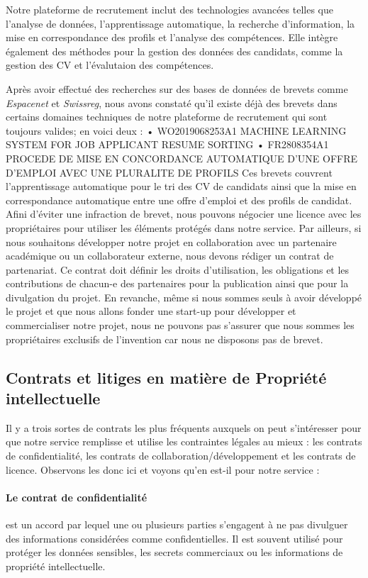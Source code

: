 Notre plateforme de recrutement inclut des technologies avancées telles que l’analyse de données, l’apprentissage automatique, la recherche d’information, la mise en correspondance des profils et l’analyse des compétences. Elle intègre également des méthodes pour la gestion des données des candidats, comme la gestion des CV et l’évalutaion des compétences.\newline 

Après avoir effectué des recherches sur des bases de données de brevets comme \textit{Espacenet} et \textit{Swissreg}, nous avons constaté qu'il existe déjà des brevets dans certains domaines techniques de notre plateforme de recrutement qui sont toujours valides; en voici deux : 
•   WO2019068253A1 MACHINE LEARNING SYSTEM FOR JOB APPLICANT RESUME SORTING
•   FR2808354A1 PROCEDE DE MISE EN CONCORDANCE AUTOMATIQUE D'UNE OFFRE D'EMPLOI AVEC UNE PLURALITE DE PROFILS
Ces brevets couvrent l'apprentissage automatique pour le tri des CV de candidats ainsi que la mise en correspondance automatique entre une offre d'emploi et des profils de candidat.
Afini d’éviter une infraction de brevet, nous pouvons négocier une licence avec les propriétaires pour utiliser les éléments protégés dans notre service. 
Par ailleurs, si nous souhaitons développer notre projet en collaboration avec un partenaire académique ou un collaborateur externe, nous devons rédiger un contrat de partenariat. Ce contrat doit définir les droits d’utilisation, les obligations et les contributions de chacun-e des partenaires pour la publication ainsi que pour la divulgation du projet. 
En revanche, même si nous sommes seuls à avoir développé le projet et que nous allons fonder une start-up pour développer et commercialiser notre projet,  nous ne pouvons pas s'assurer que nous sommes les propriétaires exclusifs de l'invention car nous ne disposons pas de brevet. 

\subsection{Contrats et litiges en matière de Propriété intellectuelle}

Il y a trois sortes de contrats les plus fréquents auxquels on peut s'intéresser pour que notre service remplisse et utilise les contraintes légales au mieux : les contrats de confidentialité, les contrats de collaboration/développement et les contrats de licence. Observons les donc ici et voyons qu'en est-il pour notre service : 

\paragraph{Le contrat de confidentialité} est un accord par lequel une ou plusieurs parties s'engagent à ne pas divulguer des informations considérées comme confidentielles. Il est souvent utilisé pour protéger les données sensibles, les secrets commerciaux ou les informations de propriété intellectuelle.

